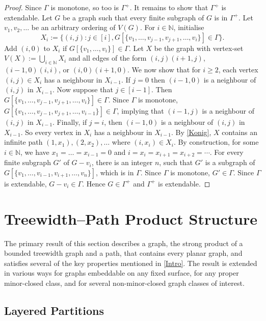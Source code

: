 \documentclass[a4paper,11pt]{article}
\theoremstyle{plain}
\theoremstyle{definition}
\renewcommand{\geq}{\geqslant}
\newcommand{\NN}{\mathbb{N}}
\begin{document}
\begin{proof}
Since $\Gamma$ is monotone, so too is $\Gamma^+$. It remains to show that $\Gamma^+$ is extendable. 	Let $G$ be a graph such that every finite subgraph of $G$ is in $\Gamma^+$. 	Let $v_1,v_2,\dots$ be an arbitrary ordering of $V(G)$. For $i\in\NN$, initialise $$X_i:= \{ (i,j): j\in[i], G[\{v_1,\dots,v_{j-1},v_{j+1},\dots,v_i\}]  \in \Gamma \}.$$	Add $(i,0)$ to $X_i$ if $G[\{v_1,\dots,v_{i}\}]  \in \Gamma$. Let $X$ be the graph with vertex-set $V(X):= \bigcup_{i\in\NN} X_i$ and all edges of the form $(i,j)(i+1,j)$, $(i-1,0)(i,i)$, or $(i,0)(i+1,0)$. We now show that for $i\geq 2$, each vertex $(i,j)\in X_i$ has a neighbour in $X_{i-1}$. If $j=0$ then $(i-1,0)$ is a neighbour of $(i,j)$ in $X_{i-1}$. 	Now suppose that $j\in[i-1]$. Then $G[\{v_1,\dots,v_{j-1},v_{j+1},\dots,v_i\}]  \in \Gamma$. Since $\Gamma$ is monotone, $G[\{v_1,\dots,v_{j-1},v_{j+1},\dots,v_{i-1}\}] \in \Gamma$, implying that $(i-1,j)$ is a neighbour of $(i,j)$ in $X_{i-1}$. 	Finally, if $j=i$, then $(i-1,0)$ is a neighbour of $(i,j)$ in $X_{i-1}$. 	So every vertex in $X_i$ has a neighbour in $X_{i-1}$. By \cref{Konig}, $X$ contains an infinite path  $(1,x_1),(2,x_2),\dots$ where $(i,x_i)\in X_i$. By construction, for some $i\in \NN$, we have  $x_1=\dots =x_{i-1}=0$ and $i=x_i=x_{i+1}=x_{i+2}=\cdots$. For every finite subgraph $G'$ of $G-v_i$, there is an integer $n$, such that $G'$ is a subgraph of $G[\{v_1,\dots,v_{i-1},v_{i+1},\dots,v_n\}]$, which is in $\Gamma$. Since $\Gamma$ is 	monotone, $G'\in\Gamma$. Since $\Gamma$ is extendable,  $G-v_i\in\Gamma$. Hence $G\in\Gamma^+$ and $\Gamma^+$ is extendable. 
\end{proof}


\section{Treewidth--Path Product Structure}
\label{TreewidthPathStructure}

The primary result of this section describes a graph, the strong product of a bounded treewidth graph and a path, that contains every planar graph, and satisfies several of the key properties mentioned in \cref{Intro}. The result is extended in various ways for graphs embeddable on any fixed surface, for any proper minor-closed class, and for several non-minor-closed graph classes of interest.

\subsection{Layered Partitions}
\end{document}
